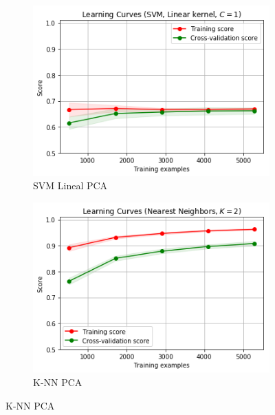 \begin{figure}[ht!]
\begin{subfigure}{.5\textwidth}
  \centering
  \includegraphics[width=.8\linewidth]{figures/SVM-Lineal-PCA.png}
  \caption{SVM Lineal PCA}
  \label{fig:sub1}
\end{subfigure}%
\begin{subfigure}{.5\textwidth}
  \centering
  \includegraphics[width=.8\linewidth]{figures/knn-results-PCA.png}
  \caption{K-NN PCA}
  \label{fig:sub2}
\end{subfigure}


\end{figure}
